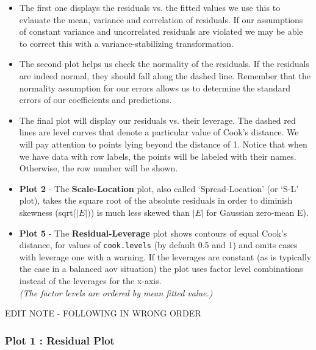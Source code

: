\documentclass[residuals.tex]{subfiles}
\begin{document}
\newpage
\begin{itemize}
\item The first one displays the residuals vs. the fitted values
 we use this to evlauate the mean, variance and correlation of residuals.
 If our assumptions of constant variance and uncorrelated residuals are
 violated we may be able to correct this with a variance-stabilizing
 transformation.
 
\item The second plot helps us check the normality of the residuals. If the
 residuals are indeed normal, they should fall along the dashed line.
 Remember that the normality assumption for our errors allows us to determine
 the standard errors of our coefficients and predictions.
 
\item The final plot will display our residuals vs. their leverage. The dashed red
 lines are level curves that denote a particular value of Cook's distance.
 We will pay attention to points lying beyond the distance of 1. Notice that
 when we have data with row labels, the points will be labeled with their
 names. Otherwise, the row number will be shown.
\end{itemize}
\newpage
\begin{itemize}
	\item \textbf{Plot 2} -
	The \textbf{Scale-Location} plot, also called ‘Spread-Location’ (or ‘S-L’ plot), takes the square root of the absolute residuals in order to diminish skewness (sqrt($|E|)$) is much less skewed than $| E |$ for Gaussian zero-mean E).
	
	\item \textbf{Plot 5} - 
	The \textbf{Residual-Leverage} plot shows contours of equal Cook's distance, for values of \texttt{cook.levels} (by default 0.5 and 1) and omits cases with leverage one with a warning. If the leverages are constant (as is typically the case in a balanced aov situation) the plot uses factor level combinations instead of the leverages for the x-axis. \\
	\textit{(The factor levels are ordered by mean fitted value.)}
\end{itemize}
\newpage
EDIT NOTE - FOLLOWING IN WRONG ORDER

\subsubsection*{Plot 1 : Residual Plot}
\end{document}
